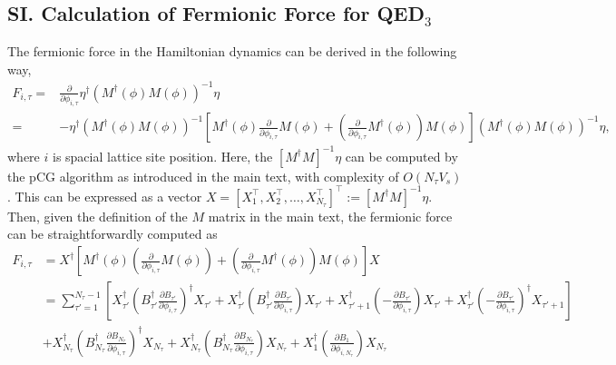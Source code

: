 \documentclass[aps,prl,twocolumn,superscriptaddress,showpacs,longbibliography]{revtex4-2}
\newcommand{\nn}{\nonumber}
\begin{document}
\begin{widetext}
\subsection*{SI. Calculation of Fermionic Force for QED$_3$}
\label{sec:SI}
The fermionic force in the Hamiltonian dynamics can be derived in the following way,
\begin{align}
F_{i, \tau} = & \frac{\partial}{\partial \phi_{i,\tau}}\eta^{\dagger}\left(M^{\dagger}(\phi)M(\phi)\right)^{-1}\eta \\
=& -\eta^{\dagger}\left(M^{\dagger}(\phi)M(\phi)\right)^{-1}
\left[M^{\dagger}(\phi)\frac{\partial}{\partial \phi_{i,\tau}}M(\phi)
+
\left(\frac{\partial}{\partial \phi_{i,\tau}}M^{\dagger}(\phi)\right)
M(\phi)\right]
\left(M^{\dagger}(\phi)M(\phi)\right)^{-1}\eta,
\label{eq:force&CG}
\end{align}
where $i$ is spacial lattice site position. Here, the $\left[M^{\dagger}M\right]^{-1} \eta$ can be computed by the pCG algorithm as introduced in the main text, with complexity of $O(N_\tau V_s)$. This can be expressed as a vector
$X = \left[ X_1^\intercal, X_2^\intercal, \ldots, X_{N_\tau}^\intercal \right]^{\intercal} := \left[M^{\dagger}M\right]^{-1} \eta$. Then, given the definition of the $M$ matrix in the main text, the fermionic force can be straightforwardly computed as
\begin{align}
F_{i, \tau} &= X^{\dagger}\left[M^{\dagger}(\phi)\left(\frac{\partial}{\partial \phi_{i, \tau}} M(\phi)\right)
+\left(\frac{\partial}{\partial \phi_{i, \tau}} M^{\dagger}(\phi)\right) M(\phi)\right]X \\
&= \sum_{\tau'=1}^{N_\tau - 1} \left[ X_{\tau'}^{\dagger}\left(B_{{\tau'}}^{\dagger} \frac{\partial B_{{\tau'}}}{\partial \phi_{i, \tau}}\right)^{\dagger} X_{\tau'} 
+
X_{\tau'}^{\dagger}\left(B_{{\tau'}}^{\dagger} \frac{\partial B_{{\tau'}}}{\partial \phi_{i, \tau}}\right) X_{\tau'} 
+
X _{ {\tau'} + 1 }^{\dagger}\left(-\frac{ \partial B _{ {\tau'}  }}{ \partial \phi _{ i , \tau }}\right) X _{ {\tau'} }
+
X _{ {\tau'} }^{\dagger}\left(-\frac{ \partial B _{ {\tau'}  }}{ \partial \phi _{ i , \tau }}\right)^{\dagger} X _{ {\tau'} + 1 } \right]
\nn \\
&  + 
X_{N_\tau}^{\dagger}\left(B_{{N_\tau}}^{\dagger} \frac{\partial B_{{N_\tau}}}{\partial \phi_{i, \tau}}\right)^{\dagger} X_{N_\tau}
+
X_{N_\tau}^{\dagger}\left(B_{{N_\tau}}^{\dagger} \frac{\partial B_{{N_\tau}}}{\partial \phi_{i, \tau}}\right) X_{N_\tau} 
+
X _{ 1 }^{\dagger}\left(\frac{ \partial B _{ 1  }}{ \partial \phi _{ i , {N_\tau} }}\right) X _{ {N_\tau} }

\end{align}
\end{widetext}
\end{document}

